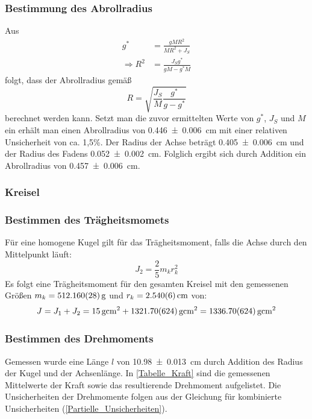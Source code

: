\documentclass[
	a4paper,
	12pt,
	pagesize,
	ngerman
]{scrartcl}
\begin{document}
	\subsubsection*{Bestimmung des Abrollradius}
	Aus
	\begin{align}
		g^* &= \frac{gMR^2}{MR^2+J_S} \\
		\Rightarrow R^2 &= \frac{J_Sg^*}{gM-g^*M}
	\end{align}
	folgt, dass der Abrollradius gemäß 
	\begin{equation}
		R = \sqrt{\frac{J_S}{M}\frac{g^*}{g-g^*}}
	\end{equation}
	berechnet werden kann. 
	Setzt man die zuvor ermittelten Werte von $g^*$, $J_S$ und $M$ ein erhält man einen Abrollradius von \SI{0,446 \pm 0,006}{cm} mit einer relativen Unsicherheit von ca. 1,5\%. %
	Der Radius der Achse beträgt \SI{0,405 \pm 0,006}{cm} und der Radius des Fadens \SI{0,052\pm 0,002}{cm}. 
	Folglich ergibt sich durch Addition ein Abrollradius von \SI{0,457 \pm 0,006}{cm}.

	\subsubsection{Kreisel}
	\subsubsection*{Bestimmen des Trägheitsmomets}
	Für eine homogene Kugel gilt für das Trägheitsmoment, falls die Achse durch den Mittelpunkt läuft:
	\begin{equation}
		\label{KugelTraegheitsmoment}
		J_2=\frac{2}{5}m_kr_k^2
	\end{equation}
	Es folgt eine Trägheitsmoment für den gesamten Kreisel mit den gemessenen Größen $m_k = \SI{512,16\pm 0,028}{g}$ und $r_k = \SI{2,54\pm 0,006}{cm}$ von:
	\begin{equation}
		J = J_1 + J_2 = \SI{15}{g cm^2} + \SI{1321,70\pm 6,24}{g cm^2} = \SI{1336,70 \pm 6,24}{g cm^2}
		\label{GesamtTraeg}
	\end{equation}
	\subsubsection*{Bestimmen des Drehmoments}
	Gemessen wurde eine Länge $l$ von \SI{10,98 \pm 0,013}{cm} durch Addition des Radius der Kugel und der Achsenlänge. 
	In \cref{Tabelle_Kraft} sind die gemessenen Mittelwerte der Kraft sowie das resultierende Drehmoment aufgelistet. 
	Die Unsicherheiten der Drehmomente folgen aus der Gleichung für kombinierte Unsicherheiten (\cref{Partielle_Unsicherheiten}). %
\end{document}
